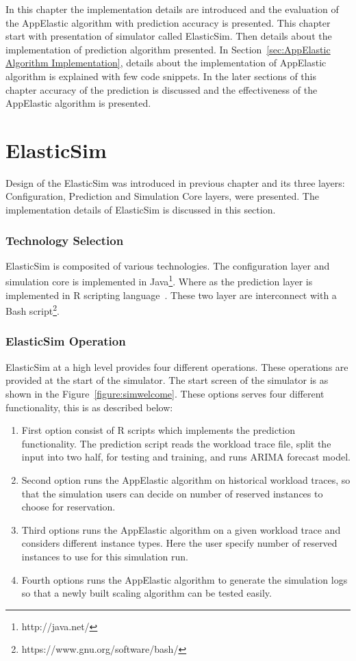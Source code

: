 In this chapter the implementation details are introduced and the evaluation of the AppElastic algorithm with prediction accuracy is presented. This chapter start with presentation of simulator called ElasticSim. Then details about the implementation of prediction algorithm presented. In Section~\ref{sec:AppElastic Algorithm Implementation}, details about the implementation of AppElastic algorithm is explained with few code snippets. In the later sections of this chapter accuracy of the prediction is discussed and the effectiveness of the AppElastic algorithm is presented.

\section{ElasticSim}
\label{section:ElasticSim}
Design of the ElasticSim was introduced in previous chapter and its three layers: Configuration, Prediction and Simulation Core layers, were presented. The implementation details of ElasticSim is discussed in this section.

\subsubsection{Technology Selection}
\label{subs:Technology Selection}
ElasticSim is composited of various technologies. The configuration layer and simulation core is implemented in Java\footnote{http://java.net/}. Where as the prediction layer is implemented in R scripting language~\cite{rstat}. These two layer are interconnect with a Bash script\footnote{https://www.gnu.org/software/bash/}.

\subsubsection{ElasticSim Operation}
\label{subs:ElasticSim Operation}
ElasticSim at a high level provides four different operations. These operations are provided at the start of the simulator. The start screen of the simulator is as shown in the Figure~\ref{figure:simwelcome}. These options serves four different functionality, this is as described below:

\begin{enumerate}
  \item First option consist of R scripts which implements the prediction functionality. The prediction script reads the workload trace file, split the input into two half, for testing and training, and runs ARIMA forecast model.
  \item Second option runs the AppElastic algorithm on historical workload traces, so that the simulation users can decide on number of reserved instances to choose for reservation.
  \item Third options runs the AppElastic algorithm on a given workload trace and considers different instance types. Here the user specify number of reserved instances to use for this simulation run.
  \item Fourth options runs the AppElastic algorithm to generate the simulation logs so that a newly built scaling algorithm can be tested easily.
\end{enumerate}

